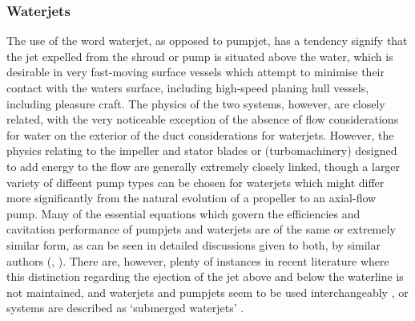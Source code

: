 \documentclass{article}\usepackage[]{graphicx}\usepackage[]{color}
\begin{document}
\subsubsection{Waterjets} \label{waterjets}

The use of the word waterjet, as opposed to pumpjet, has a tendency signify that the jet expelled from the shroud or pump is situated above the water, which is desirable in very fast-moving surface vessels which attempt to minimise their contact with the waters surface, including high-speed planing hull vessels, including pleasure craft.  The physics of the two systems, however, are closely related, with the very noticeable exception of the absence of flow considerations for water on the exterior of the duct considerations for waterjets.  However, the physics relating to the impeller and stator blades or (turbomachinery) designed to add energy to the flow are generally extremely closely linked, though a larger variety of diffeent pump types can be chosen for waterjets which might differ more significantly from the natural evolution of a propeller to an axial-flow pump. Many of the essential equations which govern the efficiencies and cavitation performance of pumpjets and waterjets are of the same or extremely similar form, as can be seen in detailed discussions given to both, by similar authors (\cite{wislicenus1973}, \cite{henderson1964}).  There are, however, plenty of instances in recent literature where this distinction regarding the ejection of the jet above and below the waterline is not maintained, and waterjets and pumpjets seem to be used interchangeably \parencite{abdel2010}, or systems are described as `submerged waterjets' \parencite{buckingham2008submarine}.
\end{document}
